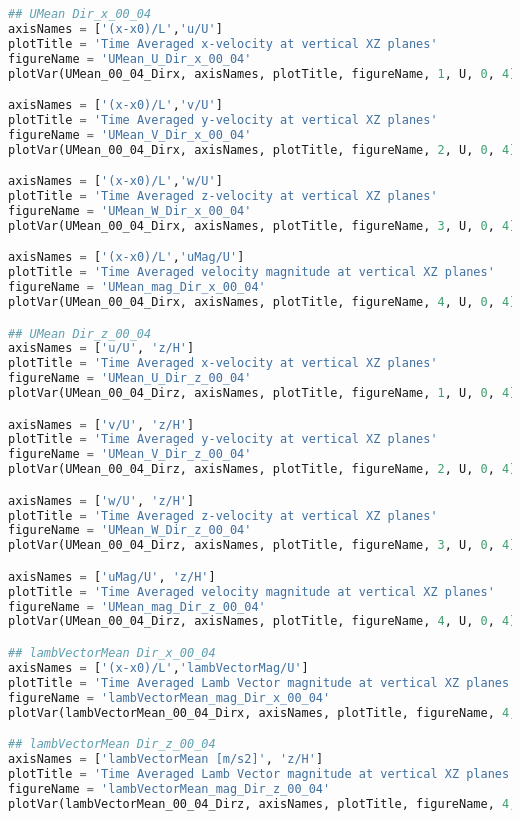 \begin{lstlisting}[language=python]
## UMean Dir_x_00_04
axisNames = ['(x-x0)/L','u/U']
plotTitle = 'Time Averaged x-velocity at vertical XZ planes'
figureName = 'UMean_U_Dir_x_00_04'
plotVar(UMean_00_04_Dirx, axisNames, plotTitle, figureName, 1, U, 0, 4)

axisNames = ['(x-x0)/L','v/U']
plotTitle = 'Time Averaged y-velocity at vertical XZ planes'
figureName = 'UMean_V_Dir_x_00_04'
plotVar(UMean_00_04_Dirx, axisNames, plotTitle, figureName, 2, U, 0, 4)

axisNames = ['(x-x0)/L','w/U']
plotTitle = 'Time Averaged z-velocity at vertical XZ planes'
figureName = 'UMean_W_Dir_x_00_04'
plotVar(UMean_00_04_Dirx, axisNames, plotTitle, figureName, 3, U, 0, 4)

axisNames = ['(x-x0)/L','uMag/U']
plotTitle = 'Time Averaged velocity magnitude at vertical XZ planes'
figureName = 'UMean_mag_Dir_x_00_04'
plotVar(UMean_00_04_Dirx, axisNames, plotTitle, figureName, 4, U, 0, 4)

## UMean Dir_z_00_04
axisNames = ['u/U', 'z/H']
plotTitle = 'Time Averaged x-velocity at vertical XZ planes'
figureName = 'UMean_U_Dir_z_00_04'
plotVar(UMean_00_04_Dirz, axisNames, plotTitle, figureName, 1, U, 0, 4)

axisNames = ['v/U', 'z/H']
plotTitle = 'Time Averaged y-velocity at vertical XZ planes'
figureName = 'UMean_V_Dir_z_00_04'
plotVar(UMean_00_04_Dirz, axisNames, plotTitle, figureName, 2, U, 0, 4)

axisNames = ['w/U', 'z/H']
plotTitle = 'Time Averaged z-velocity at vertical XZ planes'
figureName = 'UMean_W_Dir_z_00_04'
plotVar(UMean_00_04_Dirz, axisNames, plotTitle, figureName, 3, U, 0, 4)

axisNames = ['uMag/U', 'z/H']
plotTitle = 'Time Averaged velocity magnitude at vertical XZ planes'
figureName = 'UMean_mag_Dir_z_00_04'
plotVar(UMean_00_04_Dirz, axisNames, plotTitle, figureName, 4, U, 0, 4)

## lambVectorMean Dir_x_00_04
axisNames = ['(x-x0)/L','lambVectorMag/U']
plotTitle = 'Time Averaged Lamb Vector magnitude at vertical XZ planes'
figureName = 'lambVectorMean_mag_Dir_x_00_04'
plotVar(lambVectorMean_00_04_Dirx, axisNames, plotTitle, figureName, 4, 1, 0, 4)

## lambVectorMean Dir_z_00_04
axisNames = ['lambVectorMean [m/s2]', 'z/H']
plotTitle = 'Time Averaged Lamb Vector magnitude at vertical XZ planes'
figureName = 'lambVectorMean_mag_Dir_z_00_04'
plotVar(lambVectorMean_00_04_Dirz, axisNames, plotTitle, figureName, 4, 1, 0, 4)


\end{lstlisting}
